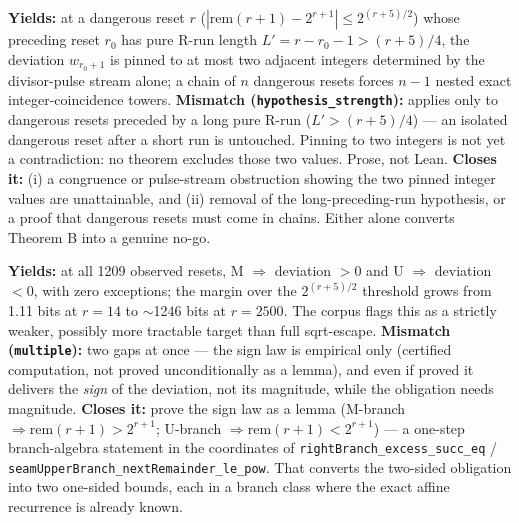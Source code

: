 \begin{obs} 
\textbf{Yields:} at a dangerous reset $r$ ($|\mathrm{rem}(r{+}1)-2^{r+1}| \le 2^{(r+5)/2}$) whose
preceding reset $r_0$ has pure R-run length $L' = r-r_0-1 > (r+5)/4$, the deviation
$w_{r_0+1}$ is pinned to at most two adjacent integers determined by the divisor-pulse stream
alone; a chain of $n$ dangerous resets forces $n{-}1$ nested exact integer-coincidence towers.
\textbf{Mismatch (\texttt{hypothesis\_strength}):} applies only to dangerous resets preceded by a
long pure R-run ($L' > (r+5)/4$) — an isolated dangerous reset after a short run is untouched.
Pinning to two integers is not yet a contradiction: no theorem excludes those two values. Prose,
not Lean.
\textbf{Closes it:} (i) a congruence or pulse-stream obstruction showing the two pinned integer
values are unattainable, and (ii) removal of the long-preceding-run hypothesis, or a proof that
dangerous resets must come in chains. Either alone converts Theorem B into a genuine no-go.
\end{obs}

\begin{obs} 
\textbf{Yields:} at all 1209 observed resets, M $\Rightarrow$ deviation $>0$ and U $\Rightarrow$
deviation $<0$, with zero exceptions; the margin over the $2^{(r+5)/2}$ threshold grows from
1.11 bits at $r=14$ to $\sim$1246 bits at $r=2500$. The corpus flags this as a strictly weaker,
possibly more tractable target than full sqrt-escape.
\textbf{Mismatch (\texttt{multiple}):} two gaps at once — the sign law is empirical only
(certified computation, not proved unconditionally as a lemma), and even if proved it delivers
the \emph{sign} of the deviation, not its magnitude, while the obligation needs magnitude.
\textbf{Closes it:} prove the sign law as a lemma (M-branch $\Rightarrow \mathrm{rem}(r{+}1) >
2^{r+1}$; U-branch $\Rightarrow \mathrm{rem}(r{+}1) < 2^{r+1}$) — a one-step branch-algebra
statement in the coordinates of \texttt{rightBranch\_excess\_succ\_eq} /
\texttt{seamUpperBranch\_nextRemainder\_le\_pow}. That converts the two-sided obligation into two
one-sided bounds, each in a branch class where the exact affine recurrence is already known.
\end{obs}

